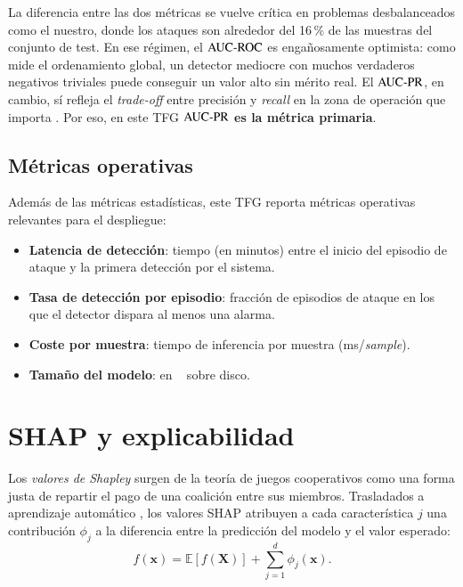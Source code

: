 La diferencia entre las dos métricas se vuelve crítica en problemas desbalanceados como el nuestro, donde los ataques son alrededor del 16\,\% de las muestras del conjunto de test. En ese régimen, el $\text{AUC-ROC}$ es engañosamente optimista: como mide el ordenamiento global, un detector mediocre con muchos verdaderos negativos triviales puede conseguir un valor alto sin mérito real. El $\text{AUC-PR}$, en cambio, sí refleja el \emph{trade-off} entre precisión y \textit{recall} en la zona de operación que importa \cite{davis2006relationship,saito2015precision}. Por eso, en este TFG \textbf{$\text{AUC-PR}$ es la métrica primaria}.

\subsection{Métricas operativas}

Además de las métricas estadísticas, este TFG reporta métricas operativas relevantes para el despliegue:
\begin{itemize}[leftmargin=*,topsep=0pt]
  \item \textbf{Latencia de detección}: tiempo (en minutos) entre el inicio del episodio de ataque y la primera detección por el sistema.
  \item \textbf{Tasa de detección por episodio}: fracción de episodios de ataque en los que el detector dispara al menos una alarma.
  \item \textbf{Coste por muestra}: tiempo de inferencia por muestra (\si{\milli\second}/\textit{sample}).
  \item \textbf{Tamaño del modelo}: en \si{\kilo\byte} sobre disco.
\end{itemize}

\section{SHAP y explicabilidad}
\label{sec:teo-shap}

Los \emph{valores de Shapley} \cite{shapley1953} surgen de la teoría de juegos cooperativos como una forma justa de repartir el pago de una coalición entre sus miembros. Trasladados a aprendizaje automático \cite{strumbelj2014explaining,lundberg2017shap}, los valores SHAP atribuyen a cada característica $j$ una contribución $\phi_j$ a la diferencia entre la predicción del modelo y el valor esperado:
\begin{equation}
f(\bm{x}) = \mathbb{E}[f(\bm{X})] + \sum_{j=1}^{d} \phi_j(\bm{x}).
\label{eq:shap}
\end{equation}

